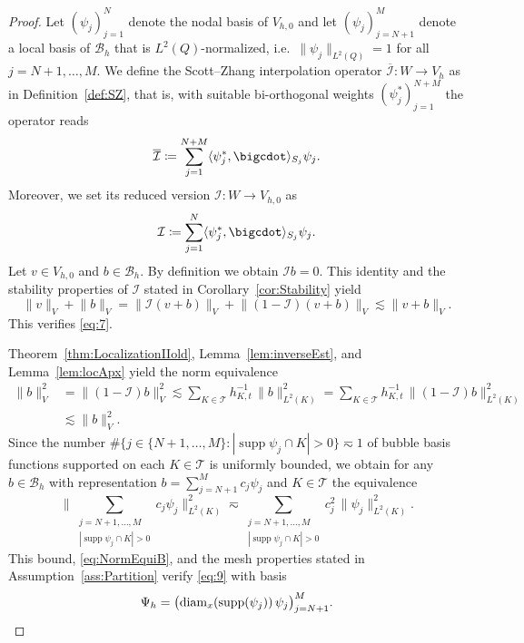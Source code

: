 \documentclass{amsart}
\providecommand{\tria}{\mathcal{T}}
\DeclareMathOperator{\supp}{supp}
\begin{document}
\begin{proof}

Let $(\psi_j)_{j=1}^N$ denote the nodal basis of $V_{h,0}$ and let $(\psi_j)_{j=N+1}^M $ denote a local basis of $\mathcal{B}_h$ that is $L^2(Q)$-normalized, i.e.~$\lVert \psi_j \rVert_{L^2(Q)}=1$ for all $j=N+1,\dots,M$.
We define the Scott--Zhang interpolation operator $\overline{\mathcal{I}}\colon W \to V_h$ as in Definition~\ref{def:SZ}, that is, with suitable bi-orthogonal weights $(\psi_j^*)_{j=1}^{N+M}$ the operator reads 
\begin{equation*}
\overline{\mathcal{I}} \coloneqq \sum_{j=1}^{N+M} \langle \psi_j^*,\bigcdot \rangle_{S_j} \psi_j.
\end{equation*}
Moreover, we set its reduced version $\mathcal{I}\colon W \to V_{h,0}$ as
\begin{equation*}
\mathcal{I} \coloneqq \sum_{j=1}^N \langle \psi_j^*,\bigcdot \rangle_{S_j} \psi_j.
\end{equation*}
Let $v\in V_{h,0}$ and $b \in \mathcal{B}_h$.
By definition we obtain $\mathcal{I} b = 0$. 
This identity and the stability properties of $\mathcal{I}$ stated in Corollary~\ref{cor:Stability} yield
\begin{equation*}
\lVert v \rVert_V + \lVert b \rVert_V = \lVert \mathcal{I} (v + b) \rVert_V + \lVert (1-\mathcal{I}) (v + b) \rVert_V  \lesssim \lVert v+b\rVert_V.
\end{equation*}
This verifies \eqref{eq:7}.


Theorem~\ref{thm:LocalizationIIold}, Lemma~\ref{lem:inverseEst}, and Lemma~\ref{lem:locApx} yield the norm equivalence
\begin{equation}\label{eq:NormEquiB}
\begin{aligned}
\|b\|_V^2 & = \|(1-\mathcal{I}) b\|_V^2  \lesssim \sum_{K \in \tria} h_{K,t}^{-1}\, \|b\|_{L^2(K)}^2 = \sum_{K \in \tria} h_{K,t}^{-1}\, \| (1-\mathcal{I})b\|_{L^2(K)}^2 \\
& \lesssim \|b\|_V^2.
\end{aligned}
\end{equation}
Since the number $\#\{ j \in \lbrace N+1,\dots,M\rbrace\colon |\supp \psi_j \cap K|>0\} \eqsim 1$ of bubble basis functions supported on each $K\in \tria$ is uniformly bounded, we obtain for any $b\in \mathcal{B}_h$ with representation $b = \sum_{j=N+1}^M c_j \psi_j$ and $K\in \tria$ the equivalence
\begin{equation*}
\Big\|\sum_{\substack{j = N+1 ,\dots,M \\ |\supp \psi_j \cap K|>0}} c_j \psi_j\Big\|_{L^2(K)} ^2\eqsim \sum_{\substack{j = N+1 ,\dots,M \\ |\supp \psi_j \cap K|>0}} c_j^2\, \| \psi_j\|_{L^2(K)}^2.
\end{equation*}
This bound, \eqref{eq:NormEquiB}, and the mesh properties stated in Assumption~\ref{ass:Partition}  verify \eqref{eq:9} with basis 
\begin{equation*}
\Psi_h = \big(\textup{diam}_x(\supp(\psi_j))  \, \psi_j\big)_{j=N+1}^M.\qedhere
\end{equation*}
\end{proof}
\end{document}
